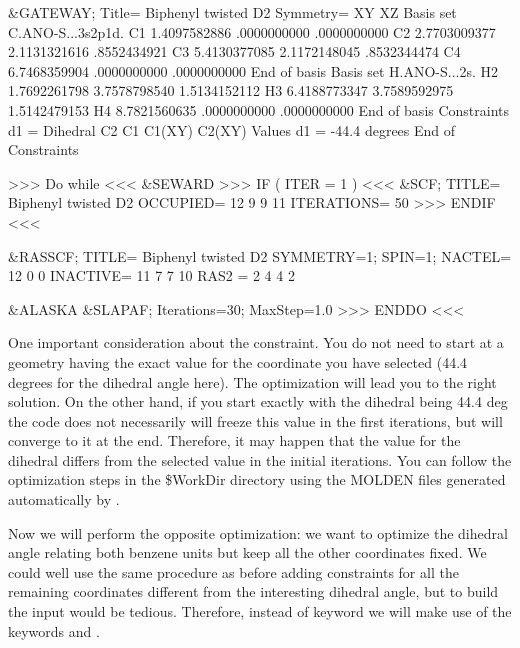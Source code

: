 \begin{inputlisting}
 &GATEWAY; Title= Biphenyl twisted D2
   Symmetry= XY XZ
   Basis set
   C.ANO-S...3s2p1d.
   C1             1.4097582886         .0000000000         .0000000000
   C2             2.7703009377        2.1131321616         .8552434921
   C3             5.4130377085        2.1172148045         .8532344474
   C4             6.7468359904         .0000000000         .0000000000
   End of basis
   Basis set
   H.ANO-S...2s.
   H2             1.7692261798        3.7578798540        1.5134152112
   H3             6.4188773347        3.7589592975        1.5142479153
   H4             8.7821560635         .0000000000         .0000000000
   End of basis
   Constraints
      d1 = Dihedral C2 C1 C1(XY) C2(XY)
   Values
      d1 = -44.4 degrees
   End of Constraints

>>> Do while <<<
 &SEWARD
>>> IF ( ITER = 1 ) <<<
 &SCF; TITLE= Biphenyl twisted D2
   OCCUPIED= 12 9 9 11
   ITERATIONS= 50
>>> ENDIF <<<

 &RASSCF; TITLE= Biphenyl twisted D2
   SYMMETRY=1; SPIN=1; NACTEL= 12    0    0
   INACTIVE= 11    7    7   10
   RAS2    =  2    4    4    2

 &ALASKA
 &SLAPAF; Iterations=30; MaxStep=1.0
>>> ENDDO <<<
\end{inputlisting}

One important consideration about the constraint. You do not need
to start at a geometry having the exact value for the coordinate
you have selected (44.4 degrees for the dihedral angle here). 
The optimization will lead you to the right solution. On the other
hand, if you start exactly with the dihedral being 44.4 deg the
code does not necessarily will freeze this value in the first
iterations, but will converge to it at the end. Therefore, it may
happen that the value for the dihedral differs from the selected
value in the initial iterations. You can follow the optimization
steps in the \$WorkDir directory using the MOLDEN files generated
automatically by \molcas.

Now we will perform the opposite optimization: we want to optimize the
dihedral angle relating both benzene units but keep all the other
coordinates fixed. We could well use the same procedure as before
adding constraints for all the remaining coordinates different from
the interesting dihedral angle, but to build the input would be
tedious. Therefore, instead of keyword  we
will make use of the keywords  and .

